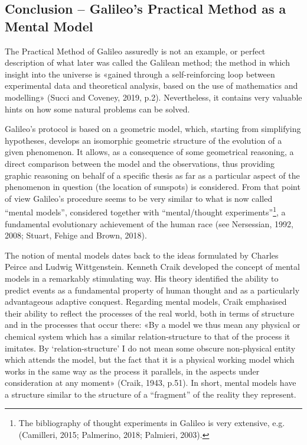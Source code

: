 \begin{artengenv}
\section{Conclusion -- Galileo’s Practical Method as a Mental Model}

The Practical Method of Galileo assuredly is not an example, or perfect description of what later was called the
Galilean method; the method in which insight into the universe is «gained through a self-reinforcing loop between
experimental data and theoretical analysis, based on the use of mathematics and modelling»
\label{ref:RNDOyv2c9QvdT}(Succi and Coveney, 2019, p.2). Nevertheless, it contains very valuable hints on how some
natural problems can be solved.

Galileo’s protocol is based on a geometric model, which, starting from simplifying hypotheses, develops an isomorphic
geometric structure of the evolution of a given phenomenon. It allows, as a consequence of some geometrical reasoning,
a direct comparison between the model and the observations, thus providing graphic reasoning on behalf of a specific
thesis as far as a particular aspect of the phenomenon in question (the location of sunspots) is considered. From that
point of view Galileo’s procedure seems to be very similar to what is now called “mental models”, considered together
with “mental/thought experiments”\footnote{ The bibliography of thought experiments in Galileo is very extensive, e.g.
\label{ref:RNDMucBAFXpFg}(Camilleri, 2015; Palmerino, 2018; Palmieri, 2003). }, a fundamental evolutionary achievement
of the human race \label{ref:RNDzUssfgcd3F}(see Nersessian, 1992, 2008; Stuart, Fehige and Brown, 2018).

The notion of mental models dates back to the ideas formulated by Charles Peirce and Ludwig Wittgenstein. Kenneth Craik
developed the concept of mental models in a remarkably stimulating way. His theory identified the ability to predict
events as a fundamental property of human thought and as a particularly advantageous adaptive conquest. Regarding
mental models, Craik emphasised their ability to reflect the processes of the real world, both in terms of structure
and in the processes that occur there: «By a model we thus mean any physical or chemical system which
has a similar relation-structure to that of the process it imitates. By ‘relation-structure’ I do not mean some obscure
non-physical entity which attends the model, but the fact that it is a physical working model which works in the same
way as the process it parallels, in the aspects under consideration at any moment» \label{ref:RNDCqLUJ0e2RC}(Craik,
1943, p.51). In short, mental models have a structure similar to the structure of a “fragment” of the reality they
represent.


\end{artengenv}

